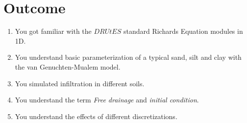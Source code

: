 \documentclass[
10pt, %
a4paper, %
oneside, %
headinclude,footinclude, %
BCOR5mm, %
]{scrartcl}
\begin{document}
\section{Outcome}
\begin{enumerate}
\item You got familiar with the $DRUtES$ standard Richards Equation modules in 1D.
\item You understand basic parameterization of a typical sand, silt and clay with the van Genuchten-Mualem model.
\item You simulated infiltration in different soils.
\item You understand the term \emph{Free drainage} and \emph{initial condition}.
\item You understand the effects of different discretizations.
\end{enumerate}





%


\end{document}
